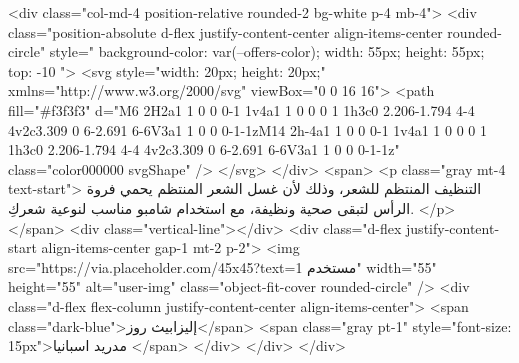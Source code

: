        <div class="col-md-4 position-relative rounded-2 bg-white p-4 mb-4">
          <div class="position-absolute d-flex justify-content-center align-items-center rounded-circle" style="
              background-color: var(--offers-color);
              width: 55px;
              height: 55px;
              top: -10%
            ">
            <svg style="width: 20px; height: 20px;" xmlns="http://www.w3.org/2000/svg" viewBox="0 0 16 16">
              <path fill="#f3f3f3"
                d="M6 2H2a1 1 0 0 0-1 1v4a1 1 0 0 0 1 1h3c0 2.206-1.794 4-4 4v2c3.309 0 6-2.691 6-6V3a1 1 0 0 0-1-1zM14 2h-4a1 1 0 0 0-1 1v4a1 1 0 0 0 1 1h3c0 2.206-1.794 4-4 4v2c3.309 0 6-2.691 6-6V3a1 1 0 0 0-1-1z"
                class="color000000 svgShape" />
            </svg>
          </div>
          <span>
            <p class="gray mt-4 text-start">
              التنظيف المنتظم للشعر، وذلك لأن غسل الشعر المنتظم يحمي فروة الرأس
              لتبقى صحية ونظيفة، مع استخدام شامبو مناسب لنوعية شعركِ.
            </p>
          </span>
          <div class="vertical-line"></div>
          <div class="d-flex justify-content-start align-items-center gap-1 mt-2 p-2">
            <img src="https://via.placeholder.com/45x45?text=مستخدم 1" width="55" height="55" alt="user-img"
              class="object-fit-cover rounded-circle" />
            <div class="d-flex flex-column justify-content-center align-items-center">
              <span class="dark-blue">إليزابيث روز</span>
              <span class="gray pt-1" style="font-size: 15px">مدريد اسبانيا
              </span>
            </div>
          </div>
        </div>


